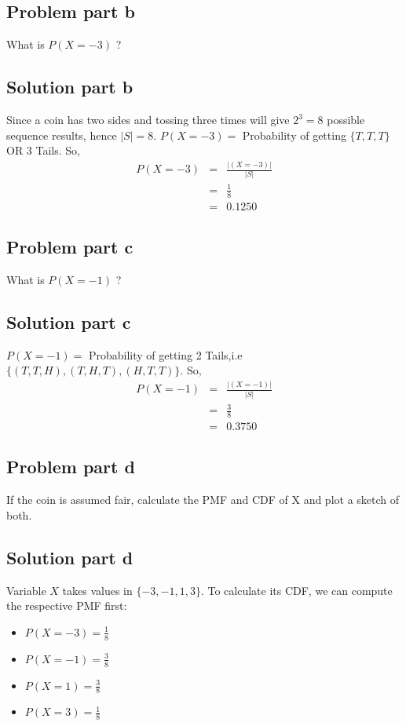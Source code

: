 \documentclass[12pt]{article}%
\newcommand\abs[1]{\left|#1\right|}
\begin{document}
\subsection*{Problem part b}
What is $P(X = −3)$ ?
\subsection*{Solution part b}
Since a coin has two sides and tossing three times will give $2^3=8$ possible sequence results, hence $\abs{S} = 8$. $P(X = −3) = $ Probability of getting $\{T,T,T\}$ OR 3 Tails. So,
\begin{eqnarray*}
P(X = −3) & = & \frac{\abs{(X =-3)}}{\abs{S}}\\
		  & = & \frac{1}{8} \\
		  & = & 0.1250
\end{eqnarray*}
\subsection*{Problem part c}
What is $P(X = −1)$ ?
\subsection*{Solution part c}
$P(X = −1) = $ Probability of getting 2 Tails,i.e $\{(T,T,H),(T,H,T),(H,T,T)\}$. So,
\begin{eqnarray*}
P(X = −1) & = & \frac{\abs{(X =-1)}}{\abs{S}}\\
		  & = & \frac{3}{8} \\
		  & = & 0.3750
\end{eqnarray*}
\subsection*{Problem part d}
If the coin is assumed fair, calculate the PMF and CDF of X and plot a sketch of both.
\subsection*{Solution part d}
Variable $X$ takes values in $\{-3,-1,1,3\}$. To calculate its CDF, we can compute the respective PMF first:
\begin{itemize}
\item $P(X=-3)=\frac{1}{8}$
\item $P(X=-1)=\frac{3}{8}$
\item $P(X=1)=\frac{3}{8}$
\item $P(X=3)=\frac{1}{8}$
\end{itemize}
\end{document}
